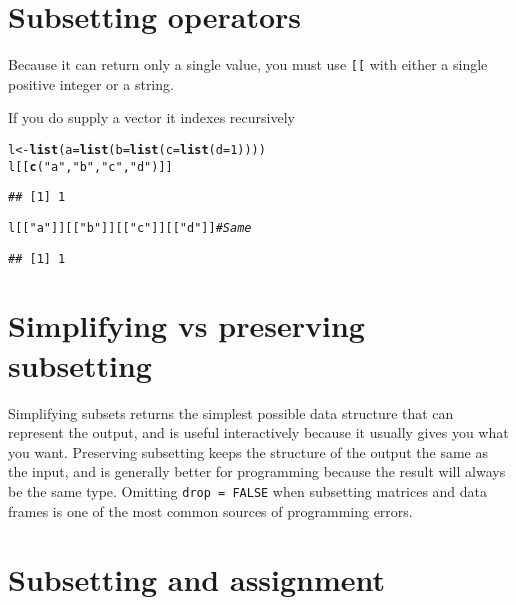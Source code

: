 \documentclass{article}\usepackage[]{graphicx}\usepackage[]{color}
\makeatletter
\newcommand{\hlnum}[1]{\textcolor[rgb]{0.686,0.059,0.569}{#1}}%
\newcommand{\hlstr}[1]{\textcolor[rgb]{0.192,0.494,0.8}{#1}}%
\newcommand{\hlcom}[1]{\textcolor[rgb]{0.678,0.584,0.686}{\textit{#1}}}%
\newcommand{\hlstd}[1]{\textcolor[rgb]{0.345,0.345,0.345}{#1}}%
\newcommand{\hlkwb}[1]{\textcolor[rgb]{0.69,0.353,0.396}{#1}}%
\newcommand{\hlkwc}[1]{\textcolor[rgb]{0.333,0.667,0.333}{#1}}%
\newcommand{\hlkwd}[1]{\textcolor[rgb]{0.737,0.353,0.396}{\textbf{#1}}}%
\newenvironment{kframe}{%
 \def\at@end@of@kframe{}%
 \ifinner\ifhmode%
  \def\at@end@of@kframe{\end{minipage}}%
  \begin{minipage}{\columnwidth}%
 \fi\fi%
 \def\FrameCommand##1{\hskip\@totalleftmargin \hskip-\fboxsep
 \colorbox{shadecolor}{##1}\hskip-\fboxsep
     \hskip-\linewidth \hskip-\@totalleftmargin \hskip\columnwidth}%
 \MakeFramed {\advance\hsize-\width
   \@totalleftmargin\z@ \linewidth\hsize
   \@setminipage}}%
 {\par\unskip\endMakeFramed%
 \at@end@of@kframe}
\newenvironment{knitrout}{}{} %
\makeatother
\begin{document}
\section{Subsetting operators}

Because it can return only a single value, you must use \verb`[[` with either a single positive integer or a string.

If you do supply a vector it indexes recursively
\begin{knitrout}
\color{fgcolor}\begin{kframe}
\begin{alltt}
\hlstd{l} \hlkwb{<-} \hlkwd{list}\hlstd{(}\hlkwc{a} \hlstd{=} \hlkwd{list}\hlstd{(}\hlkwc{b} \hlstd{=} \hlkwd{list}\hlstd{(}\hlkwc{c} \hlstd{=} \hlkwd{list}\hlstd{(}\hlkwc{d} \hlstd{=} \hlnum{1}\hlstd{))))}
\hlstd{l[[}\hlkwd{c}\hlstd{(}\hlstr{"a"}\hlstd{,} \hlstr{"b"}\hlstd{,} \hlstr{"c"}\hlstd{,} \hlstr{"d"}\hlstd{)]]}
\end{alltt}
\begin{verbatim}
## [1] 1
\end{verbatim}
\begin{alltt}
\hlstd{l[[}\hlstr{"a"}\hlstd{]][[}\hlstr{"b"}\hlstd{]][[}\hlstr{"c"}\hlstd{]][[}\hlstr{"d"}\hlstd{]]} \hlcom{# Same}
\end{alltt}
\begin{verbatim}
## [1] 1
\end{verbatim}
\end{kframe}
\end{knitrout}

\section{Simplifying vs preserving subsetting}

Simplifying subsets returns the simplest possible data structure that can represent the output, and is useful interactively because it usually gives you what you want. Preserving subsetting keeps the structure of the output the same as the input, and is generally better for programming because the result will always be the same type. Omitting \verb`drop = FALSE` when subsetting matrices and data frames is one of the most common sources of programming errors.

\section{Subsetting and assignment}
\end{document}
